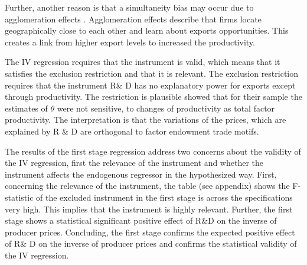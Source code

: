 Further, another reason is that a simultaneity bias may occur due to agglomeration effects \parencite{costinot}. Agglomeration effects describe  that firms locate geographically close to each other and learn about exports opportunities. This creates a link from higher export levels to  increased the productivity.  \par
The IV regression requires that the instrument is valid, which means that it satisfies the exclusion restriction and that it is relevant.  The exclusion restriction requires that the instrument R\& D has no explanatory power for exports except through productivity. The restriction is plausible  \textcite{costinot} showed that for their sample the estimates of $\theta$ were not sensitive, to changes of productivity as total factor productivity. The interpretation is that the variations of the prices, which are explained by R \& D are orthogonal to factor endowment trade motifs.
\par   The results of the first stage regression address two concerns about the validity of the IV regression, first the relevance of the instrument and whether the instrument affects the endogenous regressor in the hypothesized way. First, concerning the relevance of the instrument, the table (see appendix) shows the F-statistic of the excluded instrument in the first stage is across the specifications very high. This implies  that the instrument is highly relevant.  Further, the first stage shows a statistical significant positive effect of  R\&D on the inverse of producer prices. Concluding, the first stage confirms the expected positive effect of R\& D on the inverse of producer prices and confirms the statistical validity of the IV regression.   %
